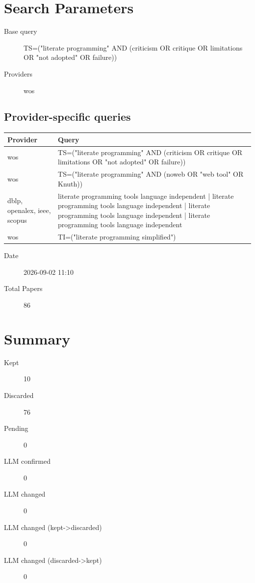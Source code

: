 \documentclass{article}
\begin{document}
\section{Search Parameters}

\begin{description}
\item[Base query] TS=("literate programming" AND (criticism OR critique OR limitations OR "not adopted" OR failure))
\item[Providers] wos
\end{description}

\subsection{Provider-specific queries}
\begin{longtable}{lp{10cm}}
\toprule
Provider & Query \\
\midrule
wos & TS=("literate programming" AND (criticism OR critique OR limitations OR "not adopted" OR failure)) \\
wos & TS=("literate programming" AND (noweb OR "web tool" OR Knuth)) \\
dblp, openalex, ieee, scopus & literate programming tools language independent | literate programming tools language independent | literate programming tools language independent | literate programming tools language independent \\
wos & TI=("literate programming simplified") \\
\bottomrule
\end{longtable}

\begin{description}
\item[Date] 2026-09-02 11:10
\item[Total Papers] 86
\end{description}

\section{Summary}
\begin{description}
\item[Kept] 10
\item[Discarded] 76
\item[Pending] 0
\item[LLM confirmed] 0
\item[LLM changed] 0
\item[LLM changed (kept->discarded)] 0
\item[LLM changed (discarded->kept)] 0
\end{description}
\end{document}
